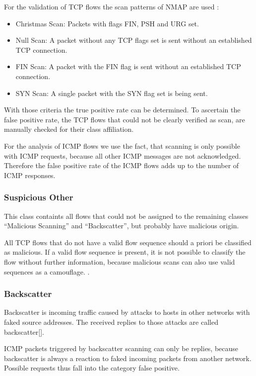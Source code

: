 \documentclass[a4paper]{scrartcl}
\begin{document}
For  the validation of TCP flows the scan patterns of NMAP are used \cite{nmap09}:
\begin{itemize}
	\item Christmas Scan:  Packets with flags FIN, PSH and URG set.
	\item Null Scan: A packet without any TCP flags set is sent without an established TCP connection. 
	\item FIN Scan: A packet with the FIN flag is sent without an established TCP connection.
	\item SYN Scan: A single packet with the SYN flag set is being sent.
\end{itemize}
With those criteria the true positive rate can be determined. 
To ascertain the false positive rate, the TCP flows that could not be clearly verified as scan, are manually checked for their class affiliation.

For the analysis of ICMP flows we use the fact, that scanning is only possible with ICMP requests, because all other ICMP messages are not acknowledged\cite{rfc_icmp}. Therefore the false positive rate of the ICMP flows adds up to the number of ICMP responses.

\subsubsection{Suspicious Other}
This class containts all flows that could not be assigned to the remaining classes ``Malicious Scanning'' and ``Backscatter'', but probably have malicious origin.

All TCP flows that do not have a valid flow sequence should a priori be classified as malicious. If a valid flow sequence is present, it is not possible to classify the flow without further information, because malicious scans can also use valid sequences as a camouflage. \cite{nmap09}.

\subsubsection{Backscatter}
Backscatter is incoming traffic caused by attacks to hosts in other networks with faked source addresses. The received replies to those attacks are called backscatter[]. 

ICMP packets triggered by backscatter scanning can only be replies, because backscatter is always a reaction to faked incoming packets from another network. Possible requests thus fall into the category false positive.
\end{document}
